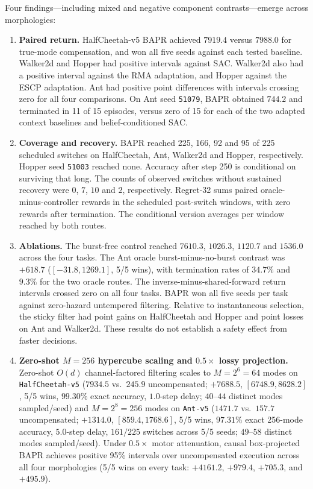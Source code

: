 \documentclass[twoside,11pt]{article}
\begin{document}
Four findings---including mixed and negative component contrasts---emerge across morphologies:
\begin{enumerate}[leftmargin=*]
    \item \textbf{Paired return.} HalfCheetah-v5 BAPR achieved $7919.4$ versus $7988.0$ for true-mode compensation, and won all five seeds against each tested baseline. Walker2d and Hopper had positive intervals against SAC. Walker2d also had a positive interval against the RMA adaptation, and Hopper against the ESCP adaptation. Ant had positive point differences with intervals crossing zero for all four comparisons. On Ant seed \texttt{51079}, BAPR obtained $744.2$ and terminated in 11 of 15 episodes, versus zero of 15 for each of the two adapted context baselines and belief-conditioned SAC.
    \item \textbf{Coverage and recovery.} BAPR reached 225, 166, 92 and 95 of 225 scheduled switches on HalfCheetah, Ant, Walker2d and Hopper, respectively. Hopper seed \texttt{51003} reached none. Accuracy after step 250 is conditional on surviving that long. The counts of observed switches without sustained recovery were $0$, $7$, $10$ and $2$, respectively. Regret-32 sums paired oracle-minus-controller rewards in the scheduled post-switch windows, with zero rewards after termination. The conditional version averages per window reached by both routes.
    \item \textbf{Ablations.} The burst-free control reached $7610.3$, $1026.3$, $1120.7$ and $1536.0$ across the four tasks. The Ant oracle burst-minus-no-burst contrast was $+618.7$ ($[-31.8,1269.1]$, 5/5 wins), with termination rates of $34.7\%$ and $9.3\%$ for the two oracle routes. The inverse-minus-shared-forward return intervals crossed zero on all four tasks. BAPR won all five seeds per task against zero-hazard untempered filtering. Relative to instantaneous selection, the sticky filter had point gains on HalfCheetah and Hopper and point losses on Ant and Walker2d. These results do not establish a safety effect from faster decisions.
    \item \textbf{Zero-shot $M=256$ hypercube scaling and $0.5\times$ lossy projection.} Zero-shot $O(d)$ channel-factored filtering scales to $M=2^6=64$ modes on \texttt{HalfCheetah-v5} ($7934.5$ vs.\ $245.9$ uncompensated; $+7688.5$, $[6748.9,8628.2]$, 5/5 wins, $99.30\%$ exact accuracy, $1.0$-step delay; $40$--$44$ distinct modes sampled/seed) and $M=2^8=256$ modes on \texttt{Ant-v5} ($1471.7$ vs.\ $157.7$ uncompensated; $+1314.0$, $[859.4,1768.6]$, 5/5 wins, $97.31\%$ exact 256-mode accuracy, $5.0$-step delay, $161/225$ switches across 5/5 seeds; $49$--$58$ distinct modes sampled/seed). Under $0.5\times$ motor attenuation, causal box-projected BAPR achieves positive 95\% intervals over uncompensated execution across all four morphologies (5/5 wins on every task: $+4161.2$, $+979.4$, $+705.3$, and $+495.9$).
\end{enumerate}
\end{document}

